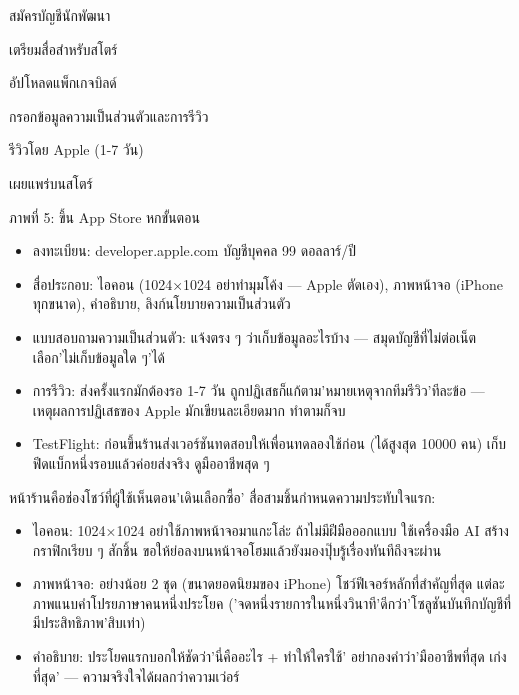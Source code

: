 
สมัครบัญชีนักพัฒนา

เตรียมสื่อสำหรับสโตร์

อัปโหลดแพ็กเกจบิลด์

กรอกข้อมูลความเป็นส่วนตัวและการรีวิว

รีวิวโดย Apple (1-7 วัน)

เผยแพร่บนสโตร์

\begin{center}\small\color{gray}ภาพที่ 5: ขึ้น App Store หกขั้นตอน\end{center}

\begin{itemize}
  \item ลงทะเบียน: developer.apple.com บัญชีบุคคล 99 ดอลลาร์/ปี
  \item สื่อประกอบ: ไอคอน (1024×1024 อย่าทำมุมโค้ง — Apple ตัดเอง), ภาพหน้าจอ (iPhone ทุกขนาด), คำอธิบาย, ลิงก์นโยบายความเป็นส่วนตัว
  \item แบบสอบถามความเป็นส่วนตัว: แจ้งตรง ๆ ว่าเก็บข้อมูลอะไรบ้าง — สมุดบัญชีที่ไม่ต่อเน็ตเลือก'ไม่เก็บข้อมูลใด ๆ'ได้
  \item การรีวิว: ส่งครั้งแรกมักต้องรอ 1-7 วัน ถูกปฏิเสธก็แก้ตาม'หมายเหตุจากทีมรีวิว'ทีละข้อ — เหตุผลการปฏิเสธของ Apple มักเขียนละเอียดมาก ทำตามก็จบ
  \item TestFlight: ก่อนขึ้นร้านส่งเวอร์ชันทดสอบให้เพื่อนทดลองใช้ก่อน (ได้สูงสุด 10000 คน) เก็บฟีดแบ็กหนึ่งรอบแล้วค่อยส่งจริง ดูมืออาชีพสุด ๆ
\end{itemize}


หน้าร้านคือช่องโชว์ที่ผู้ใช้เห็นตอน'เดินเลือกซื้อ' สื่อสามชิ้นกำหนดความประทับใจแรก:

\begin{itemize}
  \item ไอคอน: 1024×1024 อย่าใช้ภาพหน้าจอมาแกะโล่ะ ถ้าไม่มีฝีมือออกแบบ ใช้เครื่องมือ AI สร้างกราฟิกเรียบ ๆ สักชิ้น ขอให้ย่อลงบนหน้าจอโฮมแล้วยังมองปุ๊บรู้เรื่องทันทีถึงจะผ่าน
  \item ภาพหน้าจอ: อย่างน้อย 2 ชุด (ขนาดยอดนิยมของ iPhone) โชว์ฟีเจอร์หลักที่สำคัญที่สุด แต่ละภาพแนบคำโปรยภาษาคนหนึ่งประโยค ('จดหนึ่งรายการในหนึ่งวินาที'ดีกว่า'โซลูชันบันทึกบัญชีที่มีประสิทธิภาพ'สิบเท่า)
  \item คำอธิบาย: ประโยคแรกบอกให้ชัดว่า'นี่คืออะไร + ทำให้ใครใช้' อย่ากองคำว่า'มืออาชีพที่สุด เก่งที่สุด' — ความจริงใจได้ผลกว่าความเว่อร์
\end{itemize}

